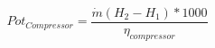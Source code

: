 \documentclass[a4paper, 12pt]{article}
\begin{document}
\begin{itemize}
\begin{itemize}
		\end{itemize}
		
		
		
		
		
		
		
		
		
		
		
		
		
		
		
		
		
		
		
		
		
		
			
	\end{itemize}		
	
	
	
	
	
	
	
	
	
	
	\begin{equation}
		Pot_{Compressor} = \frac{\dot{m}(H_2-H_1)*1000}{\eta_{compressor}}
	\end{equation}
	
\end{document}
